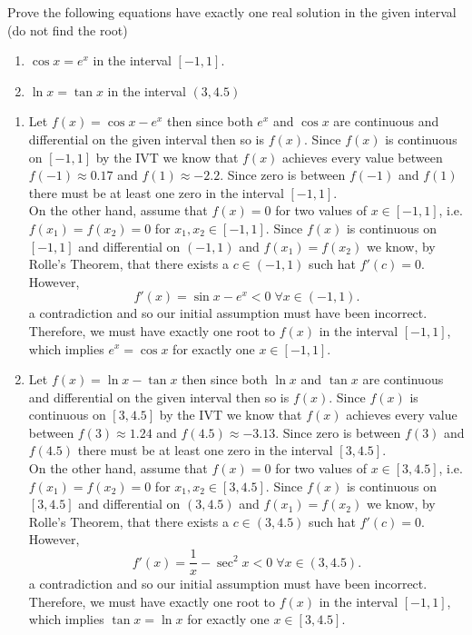 \documentclass{hwset}
\begin{document}
\begin{problem}[1.]
	Prove the following  equations have exactly one real solution in the given
	interval (do not find the root)
	\begin{enumerate}
		\item $\cos x = e^x$ in the interval $[-1,1]$.
		\item $\ln x = \tan x$ in the interval $(3,4.5)$
	\end{enumerate}
\end{problem}

\begin{enumerate}
	\item \begin{solution} 
		Let $f(x) = \cos x - e^x$ then since both $e^x$ and $\cos x$ are continuous
		and differential on the given interval then so is $f(x)$. Since $f(x)$ is
		continuous on $[-1,1]$ by the IVT we know that $f(x)$ achieves every value
		between $f(-1)\approx 0.17$ and $f(1)\approx -2.2$. Since zero is between
		$f(-1)$ and $f(1)$ there must be at least one zero in the interval $[-1,1]$.
		\\
		On the other hand, assume that $f(x) = 0$ for two values of $x\in [-1,1]$,
		i.e. $f(x_1) = f(x_2) = 0$ for $x_1,x_2\in [-1,1]$. Since $f(x)$ is
		continuous on $[-1,1]$ and differential on $(-1,1)$ and $f(x_1) = f(x_2)$ we
		know, by Rolle's Theorem, that there exists a $c\in (-1,1)$ such hat $f'(c)
		= 0$. However,
		\begin{equation*}
			f'(x) = \sin x - e^x < 0\; \forall x\in(-1,1).
		\end{equation*}
		a contradiction and so our initial assumption must have been
		incorrect. Therefore, we must have exactly one root to $f(x)$ in the
		interval $[-1,1]$, which implies $e^x = \cos x$ for exactly one $x\in
		[-1,1]$. 
	\end{solution}
	\item \begin{solution} 
		Let $f(x) = \ln x - \tan x$ then since both $\ln x$ and $\tan x$ are continuous
		and differential on the given interval then so is $f(x)$. Since $f(x)$ is
		continuous on $[3,4.5]$ by the IVT we know that $f(x)$ achieves every value
		between $f(3)\approx 1.24$ and $f(4.5)\approx -3.13$. Since zero is between
		$f(3)$ and $f(4.5)$ there must be at least one zero in the interval $[3,4.5]$.
		\\
		On the other hand, assume that $f(x) = 0$ for two values of $x\in [3,4.5]$,
		i.e. $f(x_1) = f(x_2) = 0$ for $x_1,x_2\in [3,4.5]$. Since $f(x)$ is
		continuous on $[3,4.5]$ and differential on $(3,4.5)$ and $f(x_1) = f(x_2)$ we
		know, by Rolle's Theorem, that there exists a $c\in (3,4.5)$ such hat $f'(c)
		= 0$. However,
		\begin{equation*}
			f'(x) = \frac{1}{x} - \sec^2 x < 0\; \forall x\in(3,4.5).
		\end{equation*}
		a contradiction and so our initial assumption must have been
		incorrect. Therefore, we must have exactly one root to $f(x)$ in the
		interval $[-1,1]$, which implies $\tan x = \ln x$ for exactly one $x\in
		[3,4.5]$. 
	\end{solution}
\end{enumerate}
\end{document}
